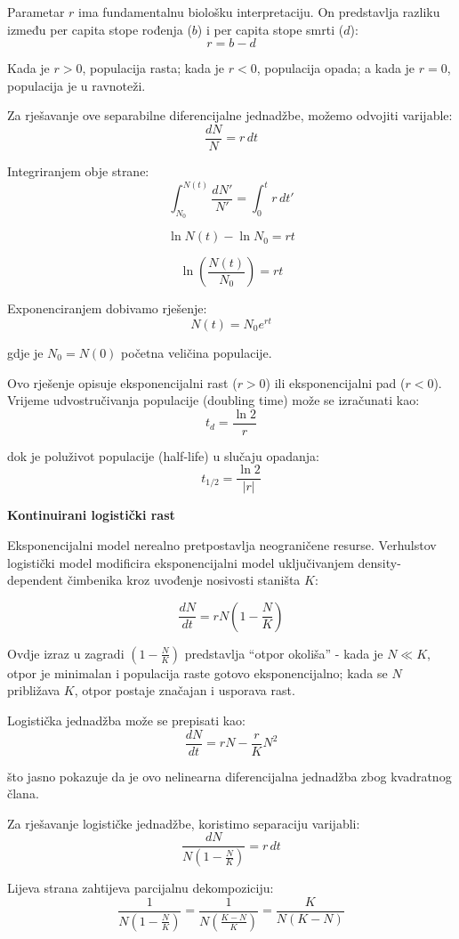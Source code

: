 \documentclass[11pt,oneside]{book}
\begin{document}
Parametar $r$ ima fundamentalnu biološku interpretaciju. On predstavlja razliku između per capita stope rođenja ($b$) i per capita stope smrti ($d$):
$$r = b - d$$

Kada je $r > 0$, populacija rasta; kada je $r < 0$, populacija opada; a kada je $r = 0$, populacija je u ravnoteži.

Za rješavanje ove separabilne diferencijalne jednadžbe, možemo odvojiti varijable:
$$\frac{dN}{N} = r \, dt$$

Integriranjem obje strane:
$$\int_{N_0}^{N(t)} \frac{dN'}{N'} = \int_0^t r \, dt'$$

$$\ln N(t) - \ln N_0 = rt$$

$$\ln\left(\frac{N(t)}{N_0}\right) = rt$$

Exponenciranjem dobivamo rješenje:
$$N(t) = N_0 e^{rt}$$

gdje je $N_0 = N(0)$ početna veličina populacije.

Ovo rješenje opisuje eksponencijalni rast ($r > 0$) ili eksponencijalni pad ($r < 0$). Vrijeme udvostručivanja populacije (doubling time) može se izračunati kao:
$$t_d = \frac{\ln 2}{r}$$

dok je poluživot populacije (half-life) u slučaju opadanja:
$$t_{1/2} = \frac{\ln 2}{|r|}$$

\textbf{Kontinuirani logistički rast}

Eksponencijalni model nerealno pretpostavlja neograničene resurse. Verhulstov logistički model modificira eksponencijalni model uključivanjem density-dependent čimbenika kroz uvođenje nosivosti staništa $K$:

$$\frac{dN}{dt} = rN\left(1-\frac{N}{K}\right)$$

Ovdje izraz u zagradi $\left(1-\frac{N}{K}\right)$ predstavlja ``otpor okoliša'' - kada je $N \ll K$, otpor je minimalan i populacija raste gotovo eksponencijalno; kada se $N$ približava $K$, otpor postaje značajan i usporava rast.

Logistička jednadžba može se prepisati kao:
$$\frac{dN}{dt} = rN - \frac{r}{K}N^2$$

što jasno pokazuje da je ovo nelinearna diferencijalna jednadžba zbog kvadratnog člana.

Za rješavanje logističke jednadžbe, koristimo separaciju varijabli:
$$\frac{dN}{N(1-\frac{N}{K})} = r \, dt$$

Lijeva strana zahtijeva parcijalnu dekompoziciju:
$$\frac{1}{N(1-\frac{N}{K})} = \frac{1}{N\left(\frac{K-N}{K}\right)} = \frac{K}{N(K-N)}$$
\end{document}

